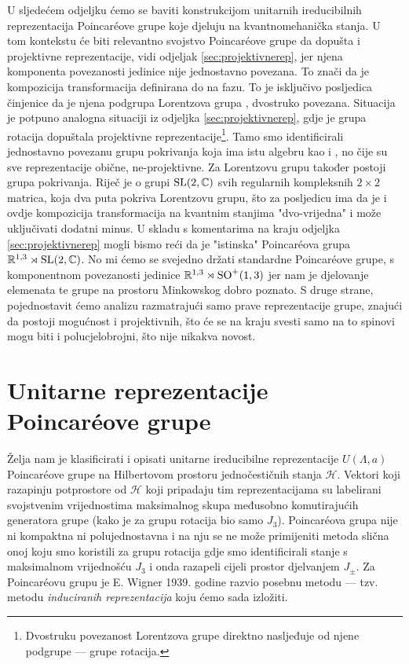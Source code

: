 U sljedećem odjeljku ćemo se baviti konstrukcijom unitarnih ireducibilnih
reprezentacija Poincar\'{e}ove grupe koje djeluju na kvantnomehanička stanja.
U tom kontekstu će biti relevantno svojstvo Poincar\'{e}ove grupe da
dopušta i projektivne reprezentacije, vidi odjeljak \ref{sec:projektivnerep},
jer njena komponenta povezanosti
jedinice nije jednostavno povezana. To znači da je kompozicija
transformacija definirana do na fazu.
To je isključivo posljedica
činjenice da je njena podgrupa Lorentzova grupa ,
dvostruko povezana. Situacija je potpuno analogna situaciji iz
odjeljka \ref{sec:projektivnerep}, gdje je grupa rotacija
 dopuštala projektivne reprezentacije\footnote{Dvostruku
    povezanost Lorentzova grupe direktno nasljeđuje
od njene podgrupe --- grupe rotacija.}. Tamo smo identificirali
jednostavno povezanu grupu pokrivanja  koja ima istu algebru
kao i , no čije su sve reprezentacije obične, ne-projektivne.
Za Lorentzovu grupu također postoji grupa pokrivanja. Riječ je
o grupi $\mathrm{SL}(2, \mathbb{C})$ svih regularnih kompleksnih
$2\times 2$ matrica, koja dva puta pokriva Lorentzovu grupu,
što za posljedicu ima da je i ovdje kompozicija transformacija
na kvantnim stanjima "dvo-vrijedna" i može uključivati dodatni
minus.
U skladu s komentarima na kraju odjeljka \ref{sec:projektivnerep} 
mogli bismo reći da je "istinska" Poincar\'{e}ova grupa
$\mathbb{R}^{1,3} \rtimes \mathrm{SL}(2, \mathbb{C})$. No mi ćemo
se svejedno držati standardne Poincar\'{e}ove grupe, s
komponentnom povezanosti jedinice $\mathbb{R}^{1,3} \rtimes \mathrm{SO}^{+}(1,3)$
jer nam je djelovanje elemenata te grupe na prostoru Minkowskog dobro poznato.
S druge strane, pojednostavit ćemo analizu razmatrajući
samo prave reprezentacije grupe, znajući da postoji mogućnost i
projektivnih, što će se na kraju svesti samo na to spinovi mogu
biti i polucjelobrojni, što nije nikakva novost.

\section{Unitarne reprezentacije Poincar\'{e}ove grupe}

Želja nam je klasificirati i opisati unitarne ireducibilne reprezentacije
$U(\Lambda, a)$
Poincar\'{e}ove grupe na Hilbertovom prostoru jednočestičnih stanja 
$\mathcal{H}$. Vektori koji razapinju potprostore od $\mathcal{H}$ koji
pripadaju tim reprezentacijama su labelirani svojstvenim vrijednostima
maksimalnog skupa međusobno komutirajućih generatora grupe
(kako je za grupu rotacija bio samo $J_3$). Poincar\'{e}ova grupa
nije ni kompaktna ni polujednostavna i na nju se ne može primijeniti
metoda slična onoj koju smo koristili za grupu rotacija  gdje smo
identificirali stanje s maksimalnom vrijednošću $J_3$ i onda razapeli
cijeli prostor djelvanjem $J_\pm$.
Za Poincar\'{e}ovu grupu je E. Wigner 1939. godine razvio posebnu
metodu --- tzv. metodu \emph{induciranih reprezentacija} koju ćemo
sada izložiti.


